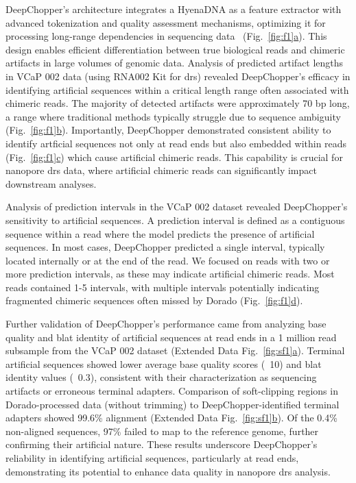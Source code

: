 \documentclass[pdflatex, sn-mathphys-num, lineno]{sn-jnl}%
\newcommand{\figref}[2]{Fig.~\hyperref[#1]{\ref*{#1}#2}}
\newcommand{\edfigref}[2]{Extended Data Fig.~\hyperref[#1]{\ref*{#1}#2}}
\theoremstyle{thmstyleone}%
\theoremstyle{thmstyletwo}%
\theoremstyle{thmstylethree}%
\begin{document}
DeepChopper's architecture integrates a HyenaDNA as a feature extractor with advanced tokenization and quality assessment mechanisms, optimizing it for processing long-range dependencies in sequencing data~\cite{nguyen2024hyenadna} (\figref{fig:f1}{a}).
This design enables efficient differentiation between true biological reads and chimeric artifacts in large volumes of genomic data.
Analysis of predicted artifact lengths in VCaP 002 data (using RNA002 Kit for \gls{drs}) revealed DeepChopper's efficacy in identifying artificial sequences within a critical length range often associated with chimeric reads.
The majority of detected artifacts were approximately 70 bp long, a range where traditional methods typically struggle due to sequence ambiguity (\figref{fig:f1}{b}).
Importantly, DeepChopper demonstrated consistent ability to identify artficial sequences not only at read ends but also embedded within reads (\figref{fig:f1}{c}) which cause artificial chimeric reads.
This capability is crucial for nanopore \gls{drs} data, where artificial chimeric reads can significantly impact downstream analyses.


Analysis of prediction intervals in the VCaP 002 dataset revealed DeepChopper's sensitivity to artificial sequences.
A prediction interval is defined as a contiguous sequence within a read where the model predicts the presence of artificial sequences.
In most cases, DeepChopper predicted a single interval, typically located internally or at the end of the read.
We focused on reads with two or more prediction intervals, as these may indicate artificial chimeric reads.
Most reads contained 1-5 intervals, with multiple intervals potentially indicating fragmented chimeric sequences often missed by Dorado (\figref{fig:f1}{d}).


Further validation of DeepChopper's performance came from analyzing base quality and \gls{blat} identity of artificial sequences at read ends in a 1 million read subsample from the VCaP 002 dataset (\edfigref{fig:sf1}{a}).
Terminal artificial sequences showed lower average base quality scores (~10) and \gls{blat} identity values (~0.3), consistent with their characterization as sequencing artifacts or erroneous terminal adapters.
Comparison of soft-clipping regions in Dorado-processed data (without trimming) to DeepChopper-identified terminal adapters showed 99.6\% alignment (\edfigref{fig:sf1}{b}).
Of the 0.4\% non-aligned sequences, 97\% failed to map to the reference genome, further confirming their artificial nature.
These results underscore DeepChopper's reliability in identifying artificial sequences, particularly at read ends, demonstrating its potential to enhance data quality in nanopore \gls{drs} analysis.
\end{document}
